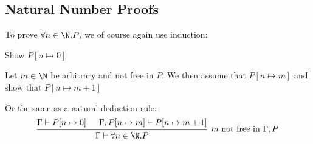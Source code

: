 \subsection{Natural Number Proofs}
To prove $\forall n \in \N. P$, we of course again use induction:

 Show $P[n \mapsto 0]$

 Let $m \in \N$ be arbitrary and not free in $P$. We then assume that $P[n \mapsto m]$ and show that $P[n \mapsto m + 1]$

Or the same as a natural deduction rule:
\[
    \begin{prooftree}
        \hypo{\Gamma \vdash P[n \mapsto 0]}
        \hypo{\Gamma, P[n \mapsto m] \vdash P[n \mapsto m + 1]}
        \infer2[$m$ not free in $\Gamma, P$]{\Gamma \vdash \forall n \in \N. P}
    \end{prooftree}
\]
